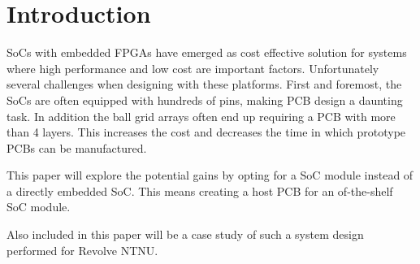 \section{Introduction}

SoCs with embedded FPGAs have emerged as cost effective solution for systems where high performance and low cost are important factors. Unfortunately several challenges when designing with these platforms. First and foremost, the SoCs are often equipped with hundreds of pins, making PCB design a daunting task. In addition the ball grid arrays often end up requiring a PCB with more than 4 layers. This increases the cost and decreases the time in which prototype PCBs can be manufactured.

This paper will explore the potential gains by opting for a SoC module instead of a directly embedded SoC. This means creating a host PCB for an of-the-shelf SoC module.

Also included in this paper will be a case study of such a system design performed for Revolve NTNU.